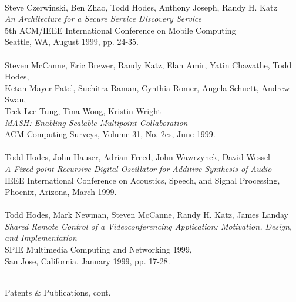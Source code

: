\begin{tabbing}
\smallskip \\[-3pt]
\>    Steve Czerwinski, Ben Zhao, Todd Hodes, Anthony Joseph, Randy H. Katz \\
\>\>      {\it An Architecture for a Secure Service Discovery Service} \\
\>\>       5th ACM/IEEE International Conference on Mobile Computing \\
\>\>       Seattle, WA, August 1999, pp. 24-35. \\
\smallskip \\[-3pt]
\>    Steven McCanne, Eric Brewer, Randy Katz, Elan Amir, Yatin Chawathe, Todd Hodes, \\
\>\>\>	Ketan Mayer-Patel, Suchitra Raman, Cynthia Romer, Angela Schuett, Andrew Swan, \\
\>\>\>		Teck-Lee Tung, Tina Wong, Kristin Wright \\
\>\>      {\it MASH: Enabling Scalable Multipoint Collaboration} \\
\>\>       ACM Computing Surveys, Volume 31, No. 2es, June 1999. \\
\smallskip \\[-3pt]
\>    Todd Hodes, John Hauser, Adrian Freed, John Wawrzynek, David Wessel \\
\>\>      {\it A Fixed-point Recursive Digital Oscillator for Additive Synthesis
        of Audio} \\
\>\>       IEEE International Conference on Acoustics, Speech, and Signal
            Processing,  \\
\>\>        Phoenix, Arizona, March 1999. \\
\smallskip \\[-3pt]
\>    Todd Hodes, Mark Newman, Steven McCanne, Randy H. Katz, James Landay \\
\>\>      {\it Shared Remote Control of a Videoconferencing Application: Motivation, Design, and Implementation} \\
\>\>       SPIE Multimedia Computing and Networking 1999,  \\
\>\>        San Jose, California, January 1999, pp. 17-28. \\
\smallskip \\[-3pt]

\end{tabbing}
\newpage
\begin{bf} \large
Patents \& Publications, cont.
\end{bf}
